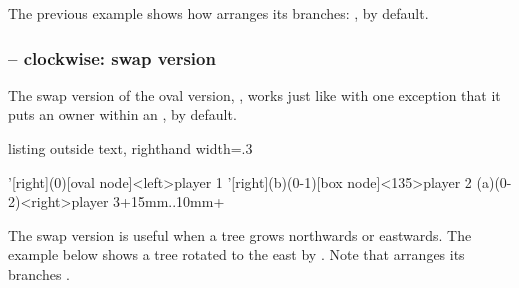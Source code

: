 The previous example shows how \cmd{\istrooto} arranges its branches: , by default.



\subsubsection{\protect{} -- clockwise: swap version}

The swap version of the oval version, , works just like  with one exception that it puts an owner within an , by default.


\begin{tcblisting}{listing outside text, righthand width=.3\linewidth}
\begin{istgame}
\xtdistance{20mm}{20mm}
\istrooto'[right](0)[oval node]<left>{player 1}
  \istb  \istb  \endist
\istrooto'[right](b)(0-1)[box node]<135>{player 2}
  \istb  \istb  \endist
\istroot(a)(0-2)<right>{player 3}+15mm..10mm+
  \istb  \istb  \endist
\end{istgame}
\end{tcblisting}

The swap version is useful when a tree grows northwards or eastwards.
The example below shows a tree rotated to the east by \icmd{\setistgrowdirection}.
Note that  arranges its branches .





